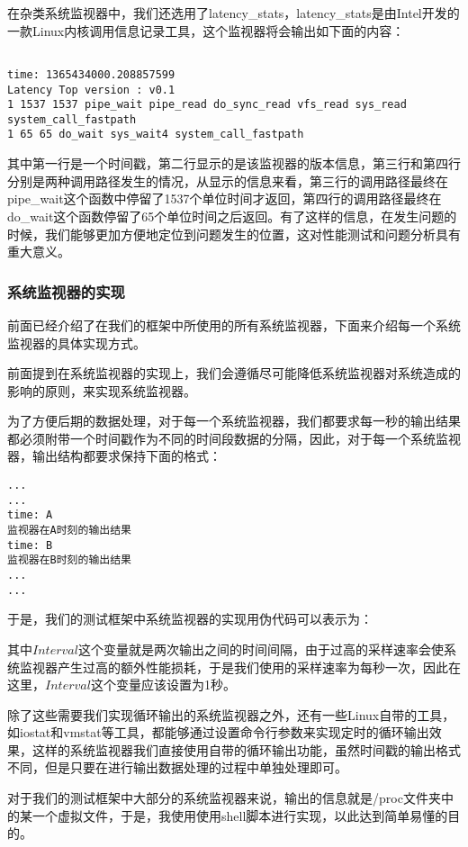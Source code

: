 在杂类系统监视器中，我们还选用了latency\_stats，latency\_stats是由Intel开发的一款Linux内核调用信息记录工具，这个监视器将会输出如下面的内容：
{
\footnotesize
\begin{verbatim}

time: 1365434000.208857599
Latency Top version : v0.1
1 1537 1537 pipe_wait pipe_read do_sync_read vfs_read sys_read system_call_fastpath
1 65 65 do_wait sys_wait4 system_call_fastpath
\end{verbatim}
}
其中第一行是一个时间戳，第二行显示的是该监视器的版本信息，第三行和第四行分别是两种调用路径发生的情况，从显示的信息来看，第三行的调用路径最终在pipe\_wait这个函数中停留了1537个单位时间才返回，第四行的调用路径最终在do\_wait这个函数停留了65个单位时间之后返回。有了这样的信息，在发生问题的时候，我们能够更加方便地定位到问题发生的位置，这对性能测试和问题分析具有重大意义。


\subsubsection{系统监视器的实现}
前面已经介绍了在我们的框架中所使用的所有系统监视器，下面来介绍每一个系统监视器的具体实现方式。

前面提到在系统监视器的实现上，我们会遵循尽可能降低系统监视器对系统造成的影响的原则，来实现系统监视器。

为了方便后期的数据处理，对于每一个系统监视器，我们都要求每一秒的输出结果都必须附带一个时间戳作为不同的时间段数据的分隔，因此，对于每一个系统监视器，输出结构都要求保持下面的格式：
\begin{verbatim}
...
...
time: A
监视器在A时刻的输出结果
time: B
监视器在B时刻的输出结果
...
...
\end{verbatim}

于是，我们的测试框架中系统监视器的实现用伪代码可以表示为：






其中$Interval$这个变量就是两次输出之间的时间间隔，由于过高的采样速率会使系统监视器产生过高的额外性能损耗，于是我们使用的采样速率为每秒一次，因此在这里，$Interval$这个变量应该设置为1秒。

除了这些需要我们实现循环输出的系统监视器之外，还有一些Linux自带的工具，如iostat和vmstat等工具，都能够通过设置命令行参数来实现定时的循环输出效果，这样的系统监视器我们直接使用自带的循环输出功能，虽然时间戳的输出格式不同，但是只要在进行输出数据处理的过程中单独处理即可。

对于我们的测试框架中大部分的系统监视器来说，输出的信息就是/proc文件夹中的某一个虚拟文件，于是，我使用使用shell脚本进行实现，以此达到简单易懂的目的。

